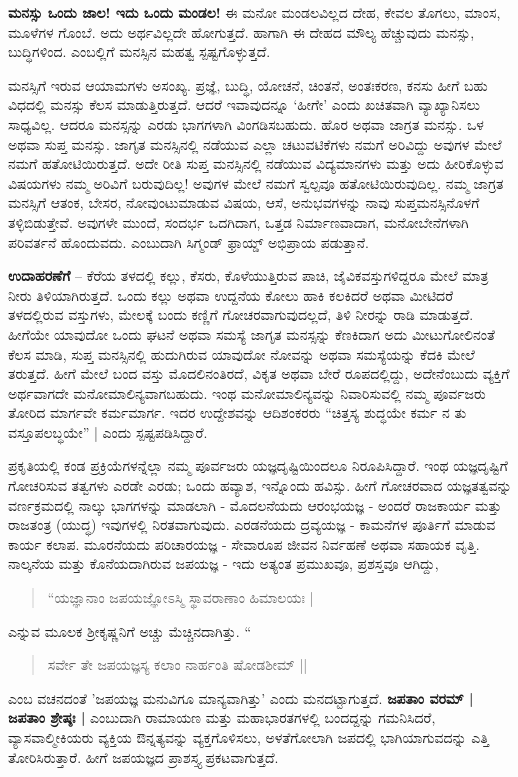 \textbf{ಮನಸ್ಸು ಒಂದು ಜಾಲ! ಇದು ಒಂದು ಮಂಡಲ!} ಈ ಮನೋ ಮಂಡಲವಿಲ್ಲದ ದೇಹ, ಕೇವಲ ತೊಗಲು, ಮಾಂಸ, ಮೂಳೆಗಳ ಗೊಂಬೆ. ಅದು ಅರ್ಥವಿಲ್ಲದೇ ಹೋಗುತ್ತದೆ. ಹಾಗಾಗಿ ಈ ದೇಹದ ಮೌಲ್ಯ ಹೆಚ್ಚುವುದು ಮನಸ್ಸು, ಬುದ್ಧಿಗಳಿಂದ. ಎಂಬಲ್ಲಿಗೆ ಮನಸ್ಸಿನ ಮಹತ್ವ ಸ್ಪಷ್ಟಗೊಳ್ಳುತ್ತದೆ.

ಮನಸ್ಸಿಗೆ ಇರುವ ಆಯಾಮಗಳು ಅಸಂಖ್ಯ. ಪ್ರಜ್ಞೆ, ಬುದ್ಧಿ, ಯೋಚನೆ, ಚಿಂತನೆ, ಅಂತಃಕರಣ, ಕನಸು ಹೀಗೆ ಬಹು ವಿಧದಲ್ಲಿ ಮನಸ್ಸು ಕೆಲಸ ಮಾಡುತ್ತಿರುತ್ತದೆ. ಆದರೆ ಇವಾವುದನ್ನೂ ‘ಹೀಗೇ’ ಎಂದು ಖಚಿತವಾಗಿ ವ್ಯಾಖ್ಯಾನಿಸಲು ಸಾಧ್ಯವಿಲ್ಲ. ಆದರೂ ಮನಸ್ಸನ್ನು ಎರಡು ಭಾಗಗಳಾಗಿ ವಿಂಗಡಿಸಬಹುದು. ಹೊರ ಅಥವಾ ಜಾಗ್ರತ ಮನಸ್ಸು. ಒಳ ಅಥವಾ ಸುಪ್ತ ಮನಸ್ಸು. ಜಾಗೃತ ಮನಸ್ಸಿನಲ್ಲಿ ನಡೆಯುವ ಎಲ್ಲಾ ಚಟುವಟಿಕೆಗಳು ನಮಗೆ ಅರಿವಿದ್ದು ಅವುಗಳ ಮೇಲೆ ನಮಗೆ ಹತೋಟಿಯಿರುತ್ತದೆ. ಅದೇ ರೀತಿ ಸುಪ್ತ ಮನಸ್ಸಿನಲ್ಲಿ ನಡೆಯುವ ವಿದ್ಯಮಾನಗಳು ಮತ್ತು ಅದು ಹೀರಿಕೊಳ್ಳುವ ವಿಷಯಗಳು ನಮ್ಮ ಅರಿವಿಗೆ ಬರುವುದಿಲ್ಲ! ಅವುಗಳ ಮೇಲೆ ನಮಗೆ ಸ್ವಲ್ಪವೂ ಹತೋಟಿಯಿರುವುದಿಲ್ಲ. ನಮ್ಮ ಜಾಗ್ರತ ಮನಸ್ಸಿಗೆ ಆತಂಕ, ಬೇಸರ, ನೋವುಂಟುಮಾಡುವ ವಿಷಯ, ಆಸೆ, ಅನುಭವಗಳನ್ನು ನಾವು ಸುಪ್ತಮನಸ್ಸಿನೊಳಗೆ ತಳ್ಳಿಬಿಡುತ್ತೇವೆ. ಅವುಗಳೇ ಮುಂದೆ, ಸಂದರ್ಭ ಒದಗಿದಾಗ, ಒತ್ತಡ ನಿರ್ಮಾಣವಾದಾಗ, ಮನೋಬೇನೆಗಳಾಗಿ ಪರಿವರ್ತನೆ ಹೊಂದುವದು. ಎಂಬುದಾಗಿ ಸಿಗ್ಮಂಡ್‌ ಫ್ರಾಯ್ಡ್ ಅಭಿಪ್ರಾಯ ಪಡುತ್ತಾನೆ.

\textbf{ಉದಾಹರಣೆಗೆ} – ಕೆರೆಯ ತಳದಲ್ಲಿ ಕಲ್ಲು, ಕೆಸರು, ಕೊಳೆಯುತ್ತಿರುವ ಪಾಚಿ, ಜೈವಿಕವಸ್ತುಗಳಿದ್ದರೂ ಮೇಲೆ ಮಾತ್ರ ನೀರು ತಿಳಿಯಾಗಿರುತ್ತದೆ. ಒಂದು ಕಲ್ಲು ಅಥವಾ ಉದ್ದನೆಯ ಕೋಲು ಹಾಕಿ ಕಲಕಿದರೆ ಅಥವಾ ಮೀಟಿದರೆ ತಳದಲ್ಲಿರುವ ವಸ್ತುಗಳು, ಮೇಲಕ್ಕೆ ಬಂದು ಕಣ್ಣಿಗೆ ಗೋಚರವಾಗುವುದಲ್ಲದೆ, ತಿಳಿ ನೀರನ್ನು ರಾಡಿ ಮಾಡುತ್ತದೆ. ಹೀಗೆಯೇ ಯಾವುದೋ ಒಂದು ಘಟನೆ ಅಥವಾ ಸಮಸ್ಯೆ ಜಾಗೃತ ಮನಸ್ಸನ್ನು ಕೆಣಕಿದಾಗ ಅದು ಮೀಟುಗೋಲಿನಂತೆ ಕೆಲಸ ಮಾಡಿ, ಸುಪ್ತ ಮನಸ್ಸಿನಲ್ಲಿ ಹುದುಗಿರುವ ಯಾವುದೋ ನೋವನ್ನು ಅಥವಾ ಸಮಸ್ಯೆಯನ್ನು ಕೆದಕಿ ಮೇಲೆ ತರುತ್ತದೆ. ಹೀಗೆ ಮೇಲೆ ಬಂದ ವಸ್ತು ಮೊದಲಿನಂತಿರದೆ, ವಿಕೃತ ಅಥವಾ ಬೇರೆ ರೂಪದಲ್ಲಿದ್ದು, ಅದೇನೆಂಬುದು ವ್ಯಕ್ತಿಗೆ ಅರ್ಥವಾಗದೇ ಮನೋಮಾಲಿನ್ಯವಾಗಬಹುದು. ಇಂಥ ಮನೋಮಾಲಿನ್ಯವನ್ನು ನಿವಾರಿಸುವಲ್ಲಿ ನಮ್ಮ ಪೂರ್ವಜರು ತೋರಿದ ಮಾರ್ಗವೇ ಕರ್ಮಮಾರ್ಗ. ಇದರ ಉದ್ದೇಶವನ್ನು ಆದಿಶಂಕರರು “ಚಿತ್ತಸ್ಯ ಶುದ್ಧಯೇ ಕರ್ಮ ನ ತು ವಸ್ತೂಪಲಬ್ಧಯೇ” | ಎಂದು ಸ್ಪಷ್ಟಪಡಿಸಿದ್ದಾರೆ.

ಪ್ರಕೃತಿಯಲ್ಲಿ ಕಂಡ ಪ್ರಕ್ರಿಯೆಗಳನ್ನೆಲ್ಲಾ ನಮ್ಮ ಪೂರ್ವಜರು ಯಜ್ಞದೃಷ್ಟಿಯಿಂದಲೂ ನಿರೂಪಿಸಿದ್ದಾರೆ. ಇಂಥ ಯಜ್ಞದೃಷ್ಟಿಗೆ ಗೋಚರಿಸುವ ತತ್ವಗಳು ಎರಡೇ ಎರಡು; ಒಂದು ಹವ್ಯಾಶ, ಇನ್ನೊಂದು ಹವಿಸ್ಸು. ಹೀಗೆ ಗೋಚರವಾದ ಯಜ್ಞತತ್ವವನ್ನು ವರ್ಣಕ್ರಮದಲ್ಲಿ ನಾಲ್ಕು ಭಾಗಗಳನ್ನು ಮಾಡಲಾಗಿ - ಮೊದಲನೆಯದು ಆರಂಭಯಜ್ಞ - ಅಂದರೆ ರಾಜಕಾರ್ಯ ಮತ್ತು ರಾಜತಂತ್ರ (ಯುದ್ಧ) ಇವುಗಳಲ್ಲಿ ನಿರತವಾಗುವುದು. ಎರಡನೆಯದು ದ್ರವ್ಯಯಜ್ಞ - ಕಾಮನೆಗಳ ಪೂರ್ತಿಗೆ ಮಾಡುವ ಕಾರ್ಯ ಕಲಾಪ. ಮೂರನೆಯದು ಪರಿಚಾರಯಜ್ಞ - ಸೇವಾರೂಪ ಜೀವನ ನಿರ್ವಹಣೆ ಅಥವಾ ಸಹಾಯಕ ವೃತ್ತಿ. ನಾಲ್ಕನೆಯ ಮತ್ತು ಕೊನೆಯದಾಗಿರುವ ಜಪಯಜ್ಞ - ಇದು ಅತ್ಯಂತ ಪ್ರಮುಖವೂ, ಪ್ರಶಸ್ತವೂ ಆಗಿದ್ದು, 
\begin{verse}
“ಯಜ್ಞಾನಾಂ ಜಪಯಜ್ಞೋಽಸ್ಮಿ ಸ್ಥಾವರಾಣಾಂ ಹಿಮಾಲಯಃ | 
\end{verse}
ಎನ್ನುವ ಮೂಲಕ ಶ್ರೀಕೃಷ್ಣನಿಗೆ ಅಚ್ಚು ಮೆಚ್ಚಿನದಾಗಿತ್ತು. “ 
\begin{verse}
ಸರ್ವೇ ತೇ ಜಪಯಜ್ಞಸ್ಯ ಕಲಾಂ ನಾರ್ಹಂತಿ ಷೋಡಶೀಮ್  || 
\end{verse}
ಎಂಬ ವಚನದಂತೆ ’ಜಪಯಜ್ಞ ಮನುವಿಗೂ ಮಾನ್ಯವಾಗಿತ್ತು’ ಎಂದು ಮನದಟ್ಟಾಗುತ್ತದೆ. \textbf{ಜಪತಾಂ ವರಮ್ | ಜಪತಾಂ ಶ್ರೇಷ್ಠಃ |} ಎಂಬುದಾಗಿ ರಾಮಾಯಣ ಮತ್ತು ಮಹಾಭಾರತಗಳಲ್ಲಿ ಬಂದದ್ದನ್ನು ಗಮನಿಸಿದರೆ, ವ್ಯಾಸವಾಲ್ಮೀಕಿಯರು ವ್ಯಕ್ತಿಯ ಔನ್ನತ್ಯವನ್ನು ವ್ಯಕ್ತಗೊಳಿಸಲು, ಅಳತೆಗೋಲಾಗಿ ಜಪದಲ್ಲಿ ಭಾಗಿಯಾಗುವದನ್ನು ಎತ್ತಿ ತೋರಿಸಿರುತ್ತಾರೆ. ಹೀಗೆ ಜಪಯಜ್ಞದ ಪ್ರಾಶಸ್ತ್ಯ ಪ್ರಕಟವಾಗುತ್ತದೆ.

